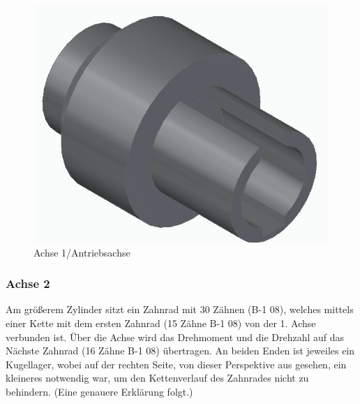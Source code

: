 \begin{figure} [H]
	\begin{center}
		\includegraphics[scale=0.4]{figures/mechanik/Antriebsachse.jpg}
			\caption{Achse 1/Antriebsachse}
			\label{fig:Achse 1/Antriebsachse}
	\end{center}
\end{figure}

\subsubsection*{Achse 2}

Am größerem Zylinder sitzt ein Zahnrad mit 30 Zähnen (B-1 08), welches mittels einer Kette mit dem ersten Zahnrad (15 Zähne B-1 08) von der 1. Achse verbunden ist. Über die Achse wird das Drehmoment und die Drehzahl auf das Nächste Zahnrad (16 Zähne B-1 08) übertragen. An beiden Enden ist jeweiles ein Kugellager, wobei auf der rechten Seite, von dieser Perspektive aus gesehen, ein kleineres notwendig war, um den Kettenverlauf des Zahnrades nicht zu behindern. (Eine genauere Erklärung folgt.)


